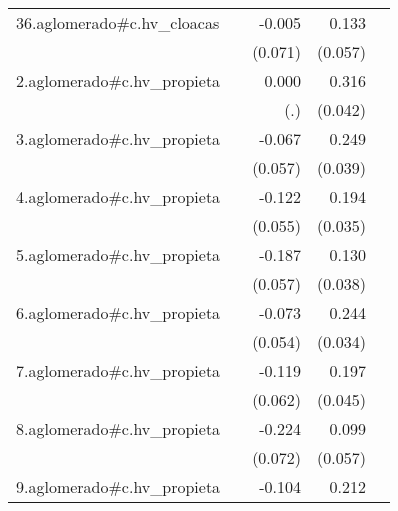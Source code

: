 {\begin{longtable}{l*{4}{D{.}{.}{-1}}}
\addlinespace
36.aglomerado#c.hv\_cloacas&                     &      -0.005         &       0.133\sym{*}  &                     \\
            &                     &     (0.071)         &     (0.057)         &                     \\
\addlinespace
2.aglomerado#c.hv\_propieta&                     &       0.000         &       0.316\sym{***}&                     \\
            &                     &         (.)         &     (0.042)         &                     \\
\addlinespace
3.aglomerado#c.hv\_propieta&                     &      -0.067         &       0.249\sym{***}&                     \\
            &                     &     (0.057)         &     (0.039)         &                     \\
\addlinespace
4.aglomerado#c.hv\_propieta&                     &      -0.122\sym{*}  &       0.194\sym{***}&                     \\
            &                     &     (0.055)         &     (0.035)         &                     \\
\addlinespace
5.aglomerado#c.hv\_propieta&                     &      -0.187\sym{**} &       0.130\sym{***}&                     \\
            &                     &     (0.057)         &     (0.038)         &                     \\
\addlinespace
6.aglomerado#c.hv\_propieta&                     &      -0.073         &       0.244\sym{***}&                     \\
            &                     &     (0.054)         &     (0.034)         &                     \\
\addlinespace
7.aglomerado#c.hv\_propieta&                     &      -0.119         &       0.197\sym{***}&                     \\
            &                     &     (0.062)         &     (0.045)         &                     \\
\addlinespace
8.aglomerado#c.hv\_propieta&                     &      -0.224\sym{**} &       0.099         &                     \\
            &                     &     (0.072)         &     (0.057)         &                     \\
\addlinespace
9.aglomerado#c.hv\_propieta&                     &      -0.104         &       0.212\sym{***}&                     \\

\end{longtable}}
